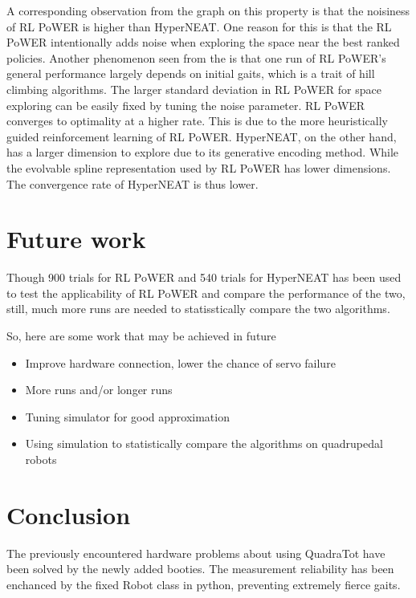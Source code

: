 
A corresponding observation from the graph on this property is that the noisiness of
RL PoWER is higher than HyperNEAT. One reason for this is that the RL PoWER intentionally adds noise when exploring the space near the best ranked policies. Another phenomenon seen from the  is that one run of RL PoWER's general performance largely depends on initial gaits, which is a trait of hill climbing algorithms. The larger standard deviation in RL PoWER for space exploring can be easily fixed by tuning the noise parameter. RL PoWER converges to optimality at a higher rate. This is due to the more heuristically guided reinforcement learning of RL PoWER. HyperNEAT, on the other hand, has a larger dimension to explore due to its generative encoding method. While the evolvable spline representation used by RL PoWER has lower dimensions. The convergence rate of HyperNEAT is thus lower.



\section{Future work}
Though 900 trials for RL PoWER and 540 trials for HyperNEAT has been used to test the applicability of RL PoWER and 
compare the performance of the two, still, much more runs are needed to statisstically compare the two algorithms.

So, here are some work that may be achieved in future
\begin{itemize}
\item Improve hardware connection, lower the chance of servo failure
\item More runs and/or longer runs
\item Tuning simulator for good approximation 
\item Using simulation to statistically compare the algorithms on quadrupedal robots
\end{itemize}



\section{Conclusion}
The previously encountered hardware problems about using QuadraTot have been solved by the newly added booties.
The measurement reliability has been enchanced by the fixed Robot class in python, preventing extremely fierce gaits. 

